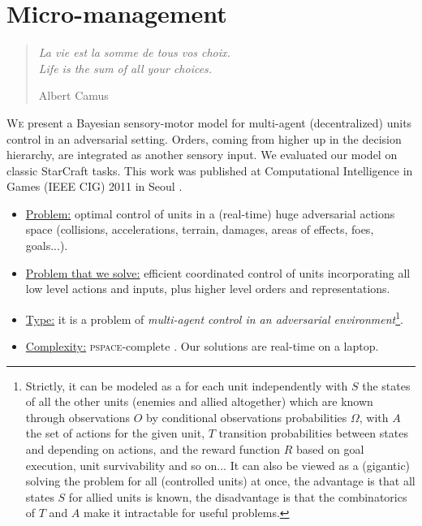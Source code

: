 \chapter{Micro-management}
\label{chapter:micro}
\begin{quotation}
\noindent
\textit{La vie est la somme de tous vos choix.
\vspace{0.2cm}\\
Life is the sum of all your choices.}
\begin{flushright}Albert Camus\end{flushright}
\end{quotation}

\lettrine{W}{e} present a Bayesian sensory-motor model for multi-agent (decentralized) units control in an adversarial setting. Orders, coming from higher up in the decision hierarchy, are integrated as another sensory input. We evaluated our model on classic StarCraft  tasks. This work was published at Computational Intelligence in Games (IEEE CIG) 2011 in Seoul \citep{SYNNAEVE:Micro}.


\begin{itemize}
\item \underline{Problem:} optimal control of units in a (real-time) huge adversarial actions space (collisions, accelerations, terrain, damages, areas of effects, foes, goals...).
\item \underline{Problem that we solve:} efficient coordinated control of units incorporating all low level actions and inputs, plus higher level orders and representations.
\item \underline{Type:} it is a problem of \textit{multi-agent control in an adversarial environment}\footnote{Strictly, it can be modeled as a  for each unit independently with $S$ the states of all the other units (enemies and allied altogether) which are known through observations $O$ by conditional observations probabilities $\Omega$, with $A$ the set of actions for the given unit, $T$ transition probabilities between states and depending on actions, and the reward function $R$ based on goal execution, unit survivability and so on... It can also be viewed as a (gigantic)  solving the problem for all (controlled units) at once, the advantage is that all states $S$ for allied units is known, the disadvantage is that the combinatorics of $T$ and $A$ make it intractable for useful problems.}.
\item \underline{Complexity:} \textsc{pspace}-complete \citep{Papadimitriou87,GamingComplexity}. Our solutions are real-time on a laptop.
\end{itemize}

